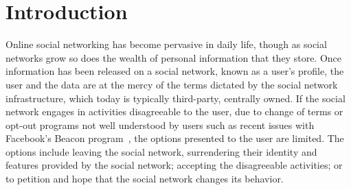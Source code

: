\documentclass{sig-alternate}
\begin{document}





\begin{abstract}

Online social networking has quickly become one of the most common Internet
activities.  As social networks evolve, they encourage users to share more
information, requiring the users, in turn, to place more trust into social
networks.  In centralized systems, this means trusting a third-party commercial
entity, like Facebook or MySpace.  Peer-to-peer (P2P) systems can enable the
creation of online social networks extending trust to friends only.  In this
paper, we present a novel approach to constructing completely decentralized
social networks through P2P overlays, OverSoc.  Our approach relies on a common
directory overlay, which facilitates friend discovery and bootstraps
connectivity to individualized profile overlays.  Each user has their own
individual profile overlay managed transparently using a public key
infrastructure (PKI).  We define necessary interfaces for constructing the
system and describe some examples of user interactions with the system.

\end{abstract}

\section{Introduction}

Online social networking has become pervasive in daily life, though as social
networks grow so does the wealth of personal information that they store.
Once information has been released on a social network, known as a user's
profile, the user and the data are at the mercy of the terms dictated by the
social network infrastructure, which today is typically third-party, centrally
owned.  If the social network engages in activities disagreeable to the user,
due to change of terms or opt-out programs not well understood by users such
as recent issues with Facebook's Beacon program~\cite{facebook_beacon}, the
options presented to the user are limited.  The options include leaving the
social network, surrendering their identity and features provided by the social
network; accepting the disagreeable activities; or to petition and hope that
the social network changes its behavior. 
\end{document}
